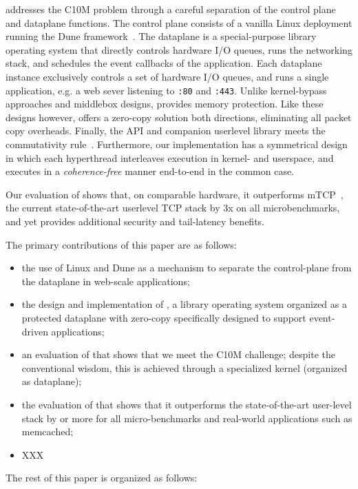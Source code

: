 \ix addresses the C10M problem through a careful separation of the
control plane and dataplane functions.  The control plane consists of a
vanilla Linux deployment running the Dune
framework~\cite{belay2012dune}.  The dataplane is a special-purpose
library operating system that directly controls hardware I/O queues,
runs the networking stack, and schedules the event callbacks of the
application.  Each dataplane instance exclusively controls a set of
hardware I/O queues, and runs a single application, e.g. a web sever
listening to \texttt{:80} and \texttt{:443}.  Unlike kernel-bypass
approaches and middlebox designs, \ix provides memory protection.
Like these designs however, \ix offers a zero-copy solution both
directions, eliminating all packet copy overheads.  Finally, the \ix
API and companion userlevel library meets the commutativity
rule~\cite{DBLP:conf/sosp/ClementsKZMK13}. Furthermore, our
implementation has a symmetrical design in which each hyperthread
interleaves execution in kernel- and userspace, and executes in a
\emph{coherence-free} manner end-to-end in the common case.

Our evaluation of \ix shows that, on comparable hardware, it
outperforms mTCP~\cite{jeong2014mtcp}, the current state-of-the-art userlevel TCP stack by
3x on all microbenchmarks, and yet provides additional security and
tail-latency benefits.


The primary contributions of this paper are as follows:

\begin{itemize}

\item  the use of Linux and Dune as a mechanism to separate the control-plane from the dataplane in web-scale applications;

\item the design and implementation of \ix, a library operating system
  organized as a protected dataplane with zero-copy specifically
  designed to support event-driven applications;

\item an evaluation of \ix that shows that we meet the C10M challenge;
  despite the conventional wisdom, this is achieved through a
  specialized kernel (organized as dataplane);

\item the evaluation of \ix that shows that it outperforms the
  state-of-the-art user-level stack by  or more for all
  micro-benchmarks and real-world applications such as memcached;

\item XXX

\end{itemize}


The rest of this paper is organized as follows: 





